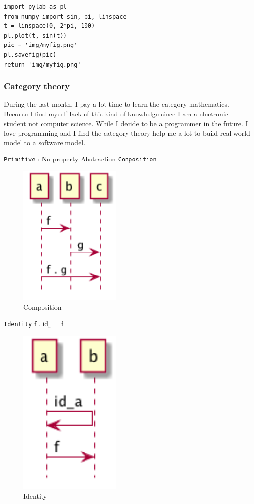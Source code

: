 \documentclass[12pt]{scrartcl}
\begin{document}
\begin{verbatim}
import pylab as pl
from numpy import sin, pi, linspace
t = linspace(0, 2*pi, 100)
pl.plot(t, sin(t))
pic = 'img/myfig.png'
pl.savefig(pic)
return 'img/myfig.png'
\end{verbatim}

\url{}
\subsubsection{Category theory}
\label{sec:org8f13b47}
During the last month, I pay a lot time to learn the category mathematics.
Because I find myself lack of this kind of knowledge since I am a electronic
student not computer science. While I decide to be a programmer in the
future. I love programming and I find the category theory help me a lot to
build real world model to a software model.

\texttt{Primitive} : No property
Abstraction
\texttt{Composition}
\begin{figure}[htbp]
\caption{\label{fig:orgce3c6df}
Composition}
\centering
\includegraphics[width=5cm]{img/composition.png}
\end{figure}

\texttt{Identity}
f . id\(_{\text{a}}\)  = f
\begin{figure}[htbp]
\caption{\label{fig:orgab00620}
Identity}
\centering
\includegraphics[width=5cm]{img/identity.png}
\end{figure}
\end{document}

